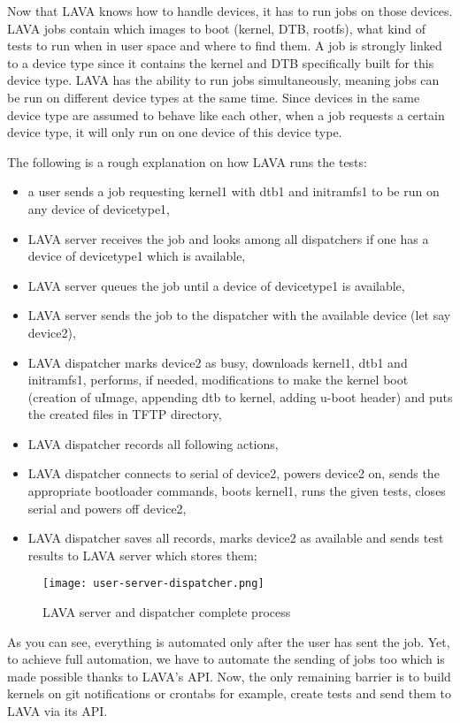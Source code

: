 Now that LAVA knows how to handle devices, it has to run jobs on those devices. LAVA jobs contain which images to boot (kernel, DTB, rootfs), what kind of tests to run when in user space and where to find them. A job is strongly linked to a device type since it contains the kernel and DTB specifically built for this device type. LAVA has the ability to run jobs simultaneously, meaning jobs can be run on different device types at the same time. Since devices in the same device type are assumed to behave like each other, when a job requests a certain device type, it will only run on one device of this device type.

The following is a rough explanation on how LAVA runs the tests:
\begin{itemize}
  \item a user sends a job requesting kernel1 with dtb1 and initramfs1 to be run on any device of devicetype1,
  \item LAVA server receives the job and looks among all dispatchers if one has a device of devicetype1 which is available,
  \item LAVA server queues the job until a device of devicetype1 is available,
  \item LAVA server sends the job to the dispatcher with the available device (let say device2),
  \item LAVA dispatcher marks device2 as busy, downloads kernel1, dtb1 and initramfs1, performs, if needed, modifications to make the kernel boot (creation of uImage, appending dtb to kernel, adding u-boot header) and puts the created files in TFTP directory,
  \item LAVA dispatcher records all following actions,
  \item LAVA dispatcher connects to serial of device2, powers device2 on, sends the appropriate bootloader commands, boots kernel1, runs the given tests, closes serial and powers off device2,
  \item LAVA dispatcher saves all records, marks device2 as available and sends test results to LAVA server which stores them;
\end{itemize}

\begin{figure}[H]
  \texttt{[image: user-server-dispatcher.png]}
  \caption{LAVA server and dispatcher complete process}
\end{figure}

As you can see, everything is automated only after the user has sent the job. Yet, to achieve full automation, we have to automate the sending of jobs too which is made possible thanks to LAVA's API. Now, the only remaining barrier is to build kernels on git notifications or crontabs for example, create tests and send them to LAVA via its API.

